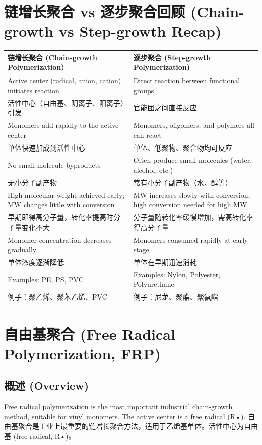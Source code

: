 \documentclass[12pt,a4paper]{ctexart}
\begin{document}
\newpage

\section{链增长聚合 vs 逐步聚合回顾 (Chain-growth vs Step-growth Recap)}

\begin{longtable}{p{6.5cm}p{6.5cm}}
\toprule
\textbf{链增长聚合 (Chain-growth Polymerization)} & \textbf{逐步聚合 (Step-growth Polymerization)} \\
\midrule
Active center (radical, anion, cation) initiates reaction & Direct reaction between functional groups \\
活性中心（自由基、阴离子、阳离子）引发 & 官能团之间直接反应 \\
Monomers add rapidly to the active center & Monomers, oligomers, and polymers all can react \\
单体快速加成到活性中心 & 单体、低聚物、聚合物均可反应 \\
No small molecule byproducts & Often produce small molecules (water, alcohol, etc.) \\
无小分子副产物 & 常有小分子副产物（水、醇等） \\
High molecular weight achieved early; MW changes little with conversion & MW increases slowly with conversion; high conversion needed for high MW \\
早期即得高分子量，转化率提高时分子量变化不大 & 分子量随转化率缓慢增加，需高转化率得高分子量 \\
Monomer concentration decreases gradually & Monomers consumed rapidly at early stage \\
单体浓度逐渐降低 & 单体在早期迅速消耗 \\
Examples: PE, PS, PVC & Examples: Nylon, Polyester, Polyurethane \\
例子：聚乙烯、聚苯乙烯、PVC & 例子：尼龙、聚酯、聚氨酯 \\
\bottomrule
\end{longtable}

\section{自由基聚合 (Free Radical Polymerization, FRP)}

\subsection{概述 (Overview)}
Free radical polymerization is the most important industrial chain-growth method, suitable for vinyl monomers. The active center is a free radical (R•).  
自由基聚合是工业上最重要的链增长聚合方法，适用于乙烯基单体。活性中心为自由基 (free radical, R•)。
\end{document}
